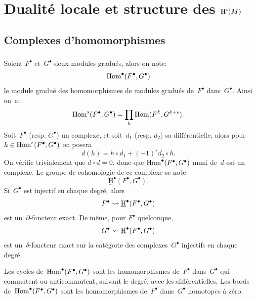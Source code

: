 \chapter{Dualit\'e locale et structure des $\operatorname{H}^i(M)$}\label{V}

\renewcommand{\theequation}{\arabic{equation}}

\section{Complexes d'homomorphismes} \label{V.1}

\subsection{} \label{V.1.1}
Soient $F^{\bullet}$ et~$G^{\bullet}$ deux modules gradu\'es, alors on note:
\begin{equation} \label{eq:V.1} \operatorname{Hom}^{\bullet}(F^{\bullet}, G^{\bullet})
\end{equation}
le module gradu\'e des homomorphismes de modules gradu\'es de~$F^{\bullet}$ dans~$G^{\bullet}$. Ainsi on~a:
\begin{equation} \label{eq:V.2} \operatorname{Hom}^{s}(F^{\bullet}, G^{\bullet})=\prod_{k}\operatorname{Hom}(F^{k}, G^{k+s}).
\end{equation}
Soit~$F^{\bullet}$ (resp. $G^{\bullet}$) un complexe, et soit~$d_{1}$ (resp. $d_{2}$) sa diff\'erentielle, alors pour $h\in\operatorname{Hom}^{s}(F^{\bullet}, G^{\bullet})$ on posera
\begin{equation} \label{eq:V.3} d(h)=h\circ d_{1}+(-1)^{s}d_{2}\circ h.
\end{equation}
On v\'erifie trivialement que $d\circ d=0$, donc que $\operatorname{Hom}^{\bullet}(F^{\bullet}, G^{\bullet})$ muni de~$d$ est un complexe. Le groupe de cohomologie de ce complexe se note
\begin{equation} \label{eq:V.4} \underset{\sim}{\mathrm{H}}^{\bullet}(F^{\bullet}, G^{\bullet}).
\end{equation}
Si~$G^{\bullet}$ est injectif en chaque degr\'e, alors
$$F^{\bullet}\rightsquigarrow\underline{\operatorname{H}}^{\bullet}(F^{\bullet}, G^{\bullet})$$
est un~$\partial$-foncteur exact. De m\^eme, pour $F^{\bullet}$ quelconque,
$$G^{\bullet}\rightsquigarrow\underline{\operatorname{H}}^{\bullet}(F^{\bullet}, G^{\bullet})$$
est un~$\delta$-foncteur exact sur la cat\'egorie des complexes~$G^{\bullet}$ injectifs en chaque degr\'e.

\begin{remarque} \label{V.1.2}
Les cycles de~$\operatorname{Hom}^{\bullet}(F^{\bullet}, G^{\bullet})$ sont les homomorphismes de~$F^{\bullet}$ dans~$G^{\bullet}$ qui commutent ou anticommutent, suivant le degr\'e, avec les diff\'erentielles. Les bords de~$\operatorname{Hom}^{\bullet}(F^{\bullet}, G^{\bullet})$ sont les homomorphismes de~$F^{\bullet}$ dans~$G^{\bullet}$ homotopes \`a z\'ero.
\end{remarque}

